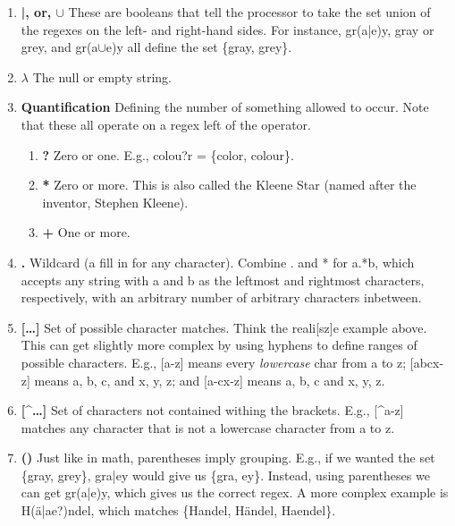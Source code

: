 \documentclass{pset_template}
\begin{document}
\begin{enumerate}
\item \textbf{|, or, $\cup$}
These are booleans that tell the processor to take the set union of the regexes
on the left- and right-hand sides.
For instance, gr(a|e)y, gray or grey, and gr(a$\cup$e)y all define the set
\{gray, grey\}.

\item \textbf{$\lambda$}
The null or empty string.

\item \textbf{Quantification}
Defining the number of something allowed to occur.
Note that these all operate on a regex left of the operator.
    \begin{enumerate}
    \item \textbf{?}
    Zero or one.
    E.g., colou?r = \{color, colour\}.
    \item \textbf{*}
    Zero or more.
    This is also called the Kleene Star (named after the inventor, Stephen Kleene).
    \item \textbf{+}
    One or more.
    \end{enumerate}

\item \textbf{.}
Wildcard (a fill in for any character).
Combine . and * for a.*b, which accepts any string with a and b as the leftmost and rightmost
characters, respectively, with an arbitrary number of arbitrary characters inbetween.

\item \textbf{[\ldots]}
Set of possible character matches.
Think the reali[sz]e example above.
This can get slightly more complex by using hyphens to define ranges of possible characters.
E.g., [a-z] means every \textit{lowercase} char from a to z;
[abcx-z] means a, b, c, and x, y, z; and [a-cx-z] means a, b, c and x, y, z.

\item \textbf{[\string^\ldots]}
Set of characters not contained withing the brackets.
E.g., [\string^a-z] matches any character that is not a lowercase character from a to z.

\item \textbf{()}
Just like in math, parentheses imply grouping.
E.g., if we wanted the set \{gray, grey\}, gra|ey would give us \{gra, ey\}.
Instead, using parentheses we can get gr(a|e)y, which gives us the correct regex.
A more complex example is H(\"{a}|ae?)ndel, which matches \{Handel, H\"{a}ndel, Haendel\}.
\end{enumerate}
\end{document}
